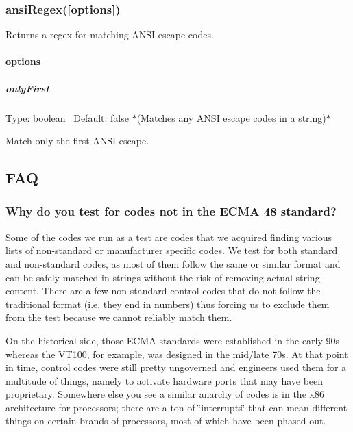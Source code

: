 \subsubsection*{ansi\+Regex(\mbox{[}options\mbox{]})}

Returns a regex for matching A\+N\+SI escape codes.

\paragraph*{options}

\subparagraph*{only\+First}

Type\+: {\ttfamily boolean}~\newline
 Default\+: {\ttfamily false} $\ast$(Matches any A\+N\+SI escape codes in a string)$\ast$

Match only the first A\+N\+SI escape.

\subsection*{F\+AQ}

\subsubsection*{Why do you test for codes not in the E\+C\+MA 48 standard?}

Some of the codes we run as a test are codes that we acquired finding various lists of non-\/standard or manufacturer specific codes. We test for both standard and non-\/standard codes, as most of them follow the same or similar format and can be safely matched in strings without the risk of removing actual string content. There are a few non-\/standard control codes that do not follow the traditional format (i.\+e. they end in numbers) thus forcing us to exclude them from the test because we cannot reliably match them.

On the historical side, those E\+C\+MA standards were established in the early 90\textquotesingle{}s whereas the V\+T100, for example, was designed in the mid/late 70\textquotesingle{}s. At that point in time, control codes were still pretty ungoverned and engineers used them for a multitude of things, namely to activate hardware ports that may have been proprietary. Somewhere else you see a similar \textquotesingle{}anarchy\textquotesingle{} of codes is in the x86 architecture for processors; there are a ton of \char`\"{}interrupts\char`\"{} that can mean different things on certain brands of processors, most of which have been phased out.

